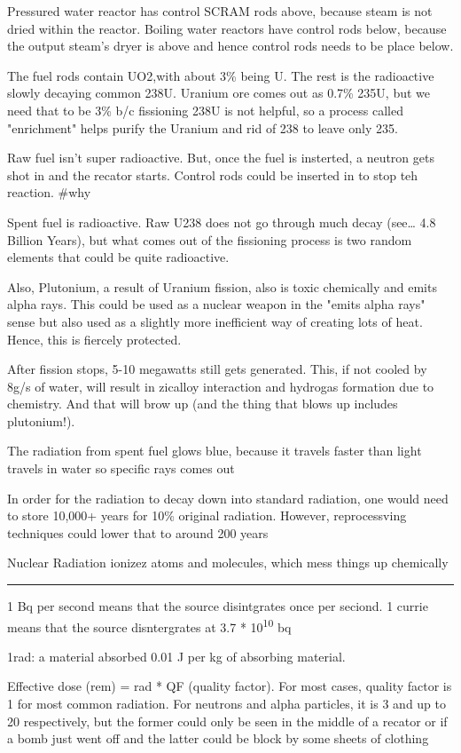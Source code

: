 \documentclass[letterpaper]{article}
\begin{document}
Pressured water reactor has control SCRAM rods above, because steam is
not dried within the reactor. Boiling water reactors have control rods
below, because the output steam's dryer is above and hence control rods
needs to be place below.

The fuel rods contain UO2,with about 3\% being U. The rest is the
radioactive slowly decaying common 238U. Uranium ore comes out as 0.7\%
235U, but we need that to be 3\% b/c fissioning 238U is not helpful, so a
process called "enrichment" helps purify the Uranium and rid of 238 to
leave only 235.

Raw fuel isn't super radioactive. But, once the fuel is insterted, a
neutron gets shot in and the recator starts. Control rods could be
inserted in to stop teh reaction. \#why

Spent fuel is radioactive. Raw U238 does not go through much decay
(see\ldots{} 4.8 Billion Years), but what comes out of the fissioning process
is two random elements that could be quite radioactive.

Also, Plutonium, a result of Uranium fission, also is toxic chemically
and emits alpha rays. This could be used as a nuclear weapon in the
"emits alpha rays" sense but also used as a slightly more inefficient
way of creating lots of heat. Hence, this is fiercely protected.

After fission stops, 5-10 megawatts still gets generated. This, if not
cooled by 8g/s of water, will result in zicalloy interaction and
hydrogas formation due to chemistry. And that will brow up (and the
thing that blows up includes plutonium!).

The radiation from spent fuel glows blue, because it travels faster than
light travels in water so specific rays comes out

In order for the radiation to decay down into standard radiation, one
would need to store 10,000+ years for 10\% original radiation. However,
reprocessving techniques could lower that to around 200 years

Nuclear Radiation ionizez atoms and molecules, which mess things up
chemically

\noindent\rule{\textwidth}{0.5pt}

1 Bq per second means that the source disintgrates once per seciond. 1
currie means that the source disntergrates at 3.7 * 10\textsuperscript{10} bq

1rad: a material absorbed 0.01 J per kg of absorbing material.

Effective dose (rem) = rad * QF (quality factor). For most cases,
quality factor is 1 for most common radiation. For neutrons and alpha
particles, it is 3 and up to 20 respectively, but the former could only
be seen in the middle of a recator or if a bomb just went off and the
latter could be block by some sheets of clothing
\end{document}
